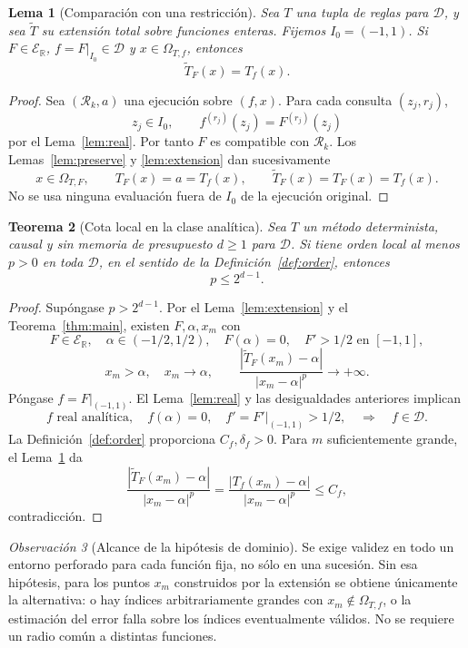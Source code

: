 \documentclass[11pt,a4paper]{article}
\numberwithin{equation}{section}
\newtheorem{theorem}{Teorema}[section]
\newtheorem{lemma}[theorem]{Lema}
\theoremstyle{definition}
\theoremstyle{remark}
\newtheorem{remark}[theorem]{Observación}
\newcommand{\R}{\mathbb R}
\newcommand{\ER}{\mathcal E_{\R}}
\newcommand{\DD}{\mathcal D}
\newcommand{\Rec}{\mathcal R}
\begin{document}
\begin{lemma}[Comparación con una restricción]\label{lem:restriction}
Sea $T$ una tupla de reglas para $\DD$, y sea $\widetilde T$ su extensión total sobre funciones enteras. Fijemos $I_0=(-1,1)$. Si $F\in\ER$, $f=F|_{I_0}\in\DD$ y $x\in\Omega_{T,f}$, entonces
\[
\widetilde T_F(x)=T_f(x).
\]
\end{lemma}
\begin{proof}
Sea $(\Rec_k,a)$ una ejecución sobre $(f,x)$. Para cada consulta $(z_j,r_j)$,
\[
z_j\in I_0,\qquad f^{(r_j)}(z_j)=F^{(r_j)}(z_j)
\]
por el Lema~\ref{lem:real}. Por tanto $F$ es compatible con $\Rec_k$. Los Lemas~\ref{lem:preserve} y \ref{lem:extension} dan sucesivamente
\[
x\in\Omega_{T,F},\qquad T_F(x)=a=T_f(x),\qquad
\widetilde T_F(x)=T_F(x)=T_f(x).
\]
No se usa ninguna evaluación fuera de $I_0$ de la ejecución original.
\end{proof}

\begin{theorem}[Cota local en la clase analítica]\label{thm:analyticbound}
Sea $T$ un método determinista, causal y sin memoria de presupuesto $d\ge1$ para $\DD$. Si tiene orden local al menos $p>0$ en toda $\DD$, en el sentido de la Definición~\ref{def:order}, entonces
\[
p\le2^{d-1}.
\]
\end{theorem}
\begin{proof}
Supóngase $p>2^{d-1}$. Por el Lema~\ref{lem:extension} y el Teorema~\ref{thm:main}, existen $F,\alpha,x_m$ con
\[
F\in\ER,\quad\alpha\in(-1/2,1/2),\quad F(\alpha)=0,\quad F'>1/2\text{ en }[-1,1],
\]
\[
x_m>\alpha,\quad x_m\to\alpha,\qquad
\frac{|\widetilde T_F(x_m)-\alpha|}{|x_m-\alpha|^p}\to+\infty.
\]
Póngase $f=F|_{(-1,1)}$. El Lema~\ref{lem:real} y las desigualdades anteriores implican
\[
f\text{ real analítica},\quad f(\alpha)=0,\quad f'=F'|_{(-1,1)}>1/2,
\quad\Longrightarrow\quad f\in\DD.
\]
La Definición~\ref{def:order} proporciona $C_f,\delta_f>0$. Para $m$ suficientemente grande, el Lema~\ref{lem:restriction} da
\[
\frac{|\widetilde T_F(x_m)-\alpha|}{|x_m-\alpha|^p}
=\frac{|T_f(x_m)-\alpha|}{|x_m-\alpha|^p}\le C_f,
\]
contradicción.
\end{proof}

\begin{remark}[Alcance de la hipótesis de dominio]
Se exige validez en todo un entorno perforado para cada función fija, no sólo en una sucesión. Sin esa hipótesis, para los puntos $x_m$ construidos por la extensión se obtiene únicamente la alternativa: o hay índices arbitrariamente grandes con $x_m\notin\Omega_{T,f}$, o la estimación del error falla sobre los índices eventualmente válidos. No se requiere un radio común a distintas funciones.
\end{remark}
\end{document}
